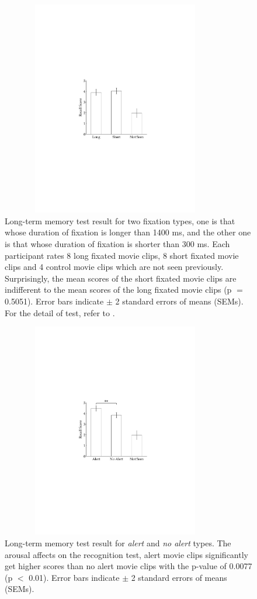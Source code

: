 \documentclass[oneside,master]{snueethesis}
\begin{document}
\begin{figure}
  \centerline{\includegraphics[width=100mm,height=94mm,trim=54mm 90mm 54mm 90mm]{./eps/memtest_leng}}
  \caption[Long-term memory test result for two fixation duration types]{Long-term memory test result for two fixation types, one is that whose duration of fixation is longer than 1400 ms, and the other one is that whose duration of fixation is shorter than 300 ms. Each participant rates 8 long fixated movie clips, 8 short fixated movie clips and 4 control movie clips which are not seen previously. Surprisingly, the mean scores of the short fixated movie clips are indifferent to the mean scores of the long fixated movie clips (p $=$ 0.5051). Error bars indicate $\pm$ 2 standard errors of means (SEMs). For the detail of test, refer to \textit{}.}
  \label{fig:memtest-leng}
\end{figure}

\begin{figure}
  \centerline{\includegraphics[width=100mm,height=94mm,trim=54mm 90mm 54mm 90mm]{./eps/memtest_alert}}
  \caption[Long-term memory test result for alert and no alert types]{Long-term memory test result for \textit{alert} and \textit{no alert} types. The arousal affects on the recognition test, alert movie clips significantly get higher scores than no alert movie clips with the p-value of 0.0077 (p $<$ 0.01). Error bars indicate $\pm$ 2 standard errors of means (SEMs).}
  \label{fig:memtest-alert}
\end{figure}
\end{document}
